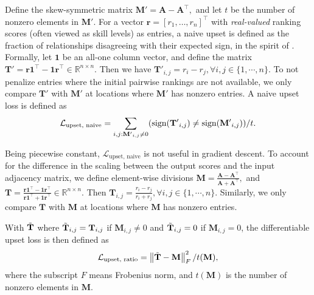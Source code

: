 \documentclass[nohyperref]{article}
\theoremstyle{plain}
\theoremstyle{definition}
\theoremstyle{remark}
\begin{document}
Define the skew-symmetric 
matrix $\mathbf{M'} = \mathbf{A} - \mathbf{A}^\top,$ and let $t$ be the number of nonzero elements in $\mathbf{M'}$. For
a vector $\mathbf{r}=[r_1, \dots,r_n]^\top$ with \emph{real-valued} ranking scores (often viewed as skill levels)  as entries, a naive upset
is defined as the fraction of relationships disagreeing with their expected sign, in the spirit of \cite{d2021ranking}. Formally, let $\mathbf{1}$ 
be an all-one column vector, and define the matrix $\mathbf{T'}=\mathbf{r1}^\top-\mathbf{1r}^\top\in\mathbb{R}^{n\times n}.$ Then we have $\mathbf{T'}_{i,j} = r_i-r_j, \forall i,j\in\{1,\cdots,n\}$. To not penalize entries where the initial pairwise rankings are not available, 
we only compare $\mathbf{T'}$ with $\mathbf{M'}$ at locations where $\mathbf{M'}$ has nonzero entries. A naive upset loss is 
defined as
\begin{equation} 
\vspace{-3mm}
    \mathcal{L}_\text{upset, naive} = 
    {\sum_{i,j:\mathbf{M'}_{i,j}\neq 0}(\text{sign}(\mathbf{T'}_{i,j})\neq \text{sign}(\mathbf{M'}_{i,j}))}/t.
    \label{eq:loss_upset_naive}
\end{equation}

Being piecewise constant, 
$\mathcal{L}_\text{upset, naive}$ is not useful in gradient descent. To account for the difference in the scaling between the output scores and the input adjacency matrix, 
we define element-wise divisions  $\mathbf{M} = \frac{\mathbf{A} - \mathbf{A}^\top}{\mathbf{A} + \mathbf{A}^\top},$ and $\mathbf{T}=\frac{\mathbf{r1}^\top-\mathbf{1r}^\top}{\mathbf{r1}^\top+\mathbf{1r}^\top}\in\mathbb{R}^{n\times n}.$ Then $\mathbf{T}_{i,j} = \frac{r_i-r_j}{r_i+r_j}, \forall i,j\in\{1,\cdots,n\}.$ 
Similarly, we only compare $\mathbf{T}$ with $\mathbf{M}$ at locations where $\mathbf{M}$ has nonzero entries.  

With $\Tilde{\mathbf{T}}$ where $\Tilde{\mathbf{T}}_{i,j}=\mathbf{T}_{i,j}$ if $\mathbf{M}_{i,j}\neq 0$ and $\Tilde{\mathbf{T}}_{i,j}=0$ if $\mathbf{M}_{i,j}= 0$, the differentiable upset loss is then defined as
\vspace{-1.5mm}
\begin{equation}
\vspace{-1.5mm}
    \mathcal{L}_\text{upset, ratio} = 
    \left\lVert \Tilde{\mathbf{T}}-\mathbf{M} \right\rVert^2_F/t(\mathbf{M}),
    \label{eq:loss_upset}
\end{equation}
where the subscript $F$ means Frobenius norm, 
and $t(\mathbf{M})$ is the number of nonzero elements in $\mathbf{M}.$
\end{document}
